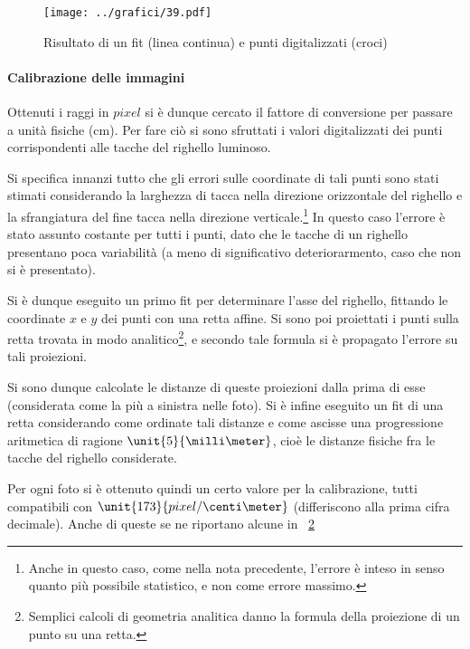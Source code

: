 \documentclass[10pt,a4paper]{article}
\begin{document}
\begin{figure}[H]
	\centering
	\texttt{[image: ../grafici/39.pdf]}
	\caption{Risultato di un fit (linea continua) e punti digitalizzati (croci)}
	\label{fig:fitcfr}
\end{figure}

\paragraph{Calibrazione delle immagini} Ottenuti i raggi in $pixel$ si è dunque cercato il fattore di conversione per passare a unità fisiche (cm). Per fare ciò si sono sfruttati i valori digitalizzati dei punti corrispondenti alle tacche del righello luminoso.

Si specifica innanzi tutto che gli errori sulle coordinate di tali punti sono stati stimati considerando la larghezza di tacca nella direzione orizzontale del righello e la sfrangiatura del fine tacca nella direzione verticale.\footnote{Anche in questo caso, come nella nota precedente, l'errore è inteso in senso quanto più possibile statistico, e non come errore massimo.}
In questo caso l'errore è stato assunto costante per tutti i punti, dato che le tacche di un righello presentano poca variabilità (a meno di significativo deteriorarmento, caso che non si è presentato).

Si è dunque eseguito un primo fit per determinare l'asse del righello, fittando le coordinate $x$ e $y$ dei punti con una retta affine.
Si sono poi proiettati i punti sulla retta trovata in modo analitico\footnote{Semplici calcoli di geometria analitica danno la formula della proiezione di un punto su una retta.}, e secondo tale formula si è propagato l'errore su tali proiezioni.

Si sono dunque calcolate le distanze di queste proiezioni dalla prima di esse (considerata come la più a sinistra nelle foto). Si è infine eseguito un fit di una retta considerando come ordinate tali distanze e come ascisse una progressione aritmetica di ragione $\unit{5}{\milli\meter}$, cioè le distanze fisiche fra le tacche del righello considerate.

Per ogni foto si è ottenuto quindi un certo valore per la calibrazione, tutti compatibili con  $\unit{173}{pixel / \centi\meter}$ (differiscono alla prima cifra decimale). Anche di queste se ne riportano alcune in \tablename{~\ref{tab:somecal}}

\begin{figure}[H]
	\centering
	\resizebox{0.3\textwidth}{!}{
		}
	\label{tab:somecal}
\end{figure}
\end{document}
